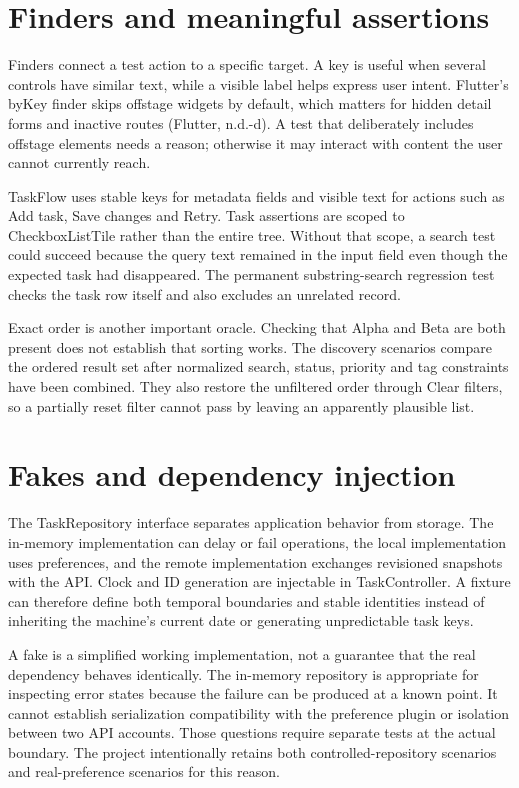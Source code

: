 \documentclass[12pt,a4paper,oneside]{report}
\begin{document}
\section{Finders and meaningful assertions}
Finders connect a test action to a specific target. A key is useful when several controls have similar text, while a visible label helps express user intent. Flutter's byKey finder skips offstage widgets by default, which matters for hidden detail forms and inactive routes (Flutter, n.d.-d). A test that deliberately includes offstage elements needs a reason; otherwise it may interact with content the user cannot currently reach.

TaskFlow uses stable keys for metadata fields and visible text for actions such as Add task, Save changes and Retry. Task assertions are scoped to CheckboxListTile rather than the entire tree. Without that scope, a search test could succeed because the query text remained in the input field even though the expected task had disappeared. The permanent substring-search regression test checks the task row itself and also excludes an unrelated record.

Exact order is another important oracle. Checking that Alpha and Beta are both present does not establish that sorting works. The discovery scenarios compare the ordered result set after normalized search, status, priority and tag constraints have been combined. They also restore the unfiltered order through Clear filters, so a partially reset filter cannot pass by leaving an apparently plausible list.

\section{Fakes and dependency injection}
The TaskRepository interface separates application behavior from storage. The in-memory implementation can delay or fail operations, the local implementation uses preferences, and the remote implementation exchanges revisioned snapshots with the API. Clock and ID generation are injectable in TaskController. A fixture can therefore define both temporal boundaries and stable identities instead of inheriting the machine's current date or generating unpredictable task keys.

A fake is a simplified working implementation, not a guarantee that the real dependency behaves identically. The in-memory repository is appropriate for inspecting error states because the failure can be produced at a known point. It cannot establish serialization compatibility with the preference plugin or isolation between two API accounts. Those questions require separate tests at the actual boundary. The project intentionally retains both controlled-repository scenarios and real-preference scenarios for this reason.
\end{document}
